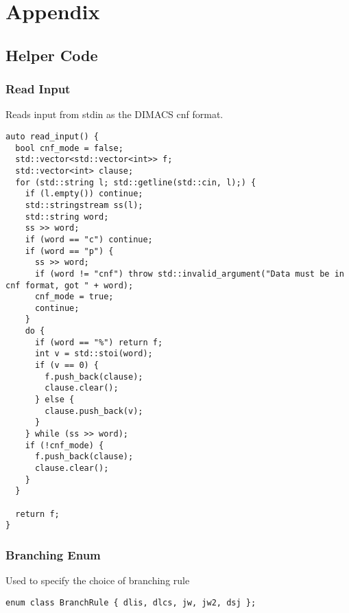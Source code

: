 \documentclass[10pt,AMS Euler]{article}
\begin{document}
\section*{Appendix}
\label{sec:org3e11fc8}
\subsection*{Helper Code}
\label{sec:org4f85823}
\subsubsection*{Read Input}
\label{sec:org69d1bf0}
Reads input from stdin as the DIMACS cnf format.
\begin{verbatim}
auto read_input() {
  bool cnf_mode = false;
  std::vector<std::vector<int>> f;
  std::vector<int> clause;
  for (std::string l; std::getline(std::cin, l);) {
    if (l.empty()) continue;
    std::stringstream ss(l);
    std::string word;
    ss >> word;
    if (word == "c") continue;
    if (word == "p") {
      ss >> word;
      if (word != "cnf") throw std::invalid_argument("Data must be in cnf format, got " + word);
      cnf_mode = true;
      continue;
    }
    do {
      if (word == "%") return f;
      int v = std::stoi(word);
      if (v == 0) {
        f.push_back(clause);
        clause.clear();
      } else {
        clause.push_back(v);
      }
    } while (ss >> word);
    if (!cnf_mode) { 
      f.push_back(clause);
      clause.clear();
    }
  }
  
  return f;
}
\end{verbatim}
\subsubsection*{Branching Enum}
\label{sec:org3c6a9d6}
Used to specify the choice of branching rule
\begin{verbatim}
enum class BranchRule { dlis, dlcs, jw, jw2, dsj };
\end{verbatim}
\end{document}
